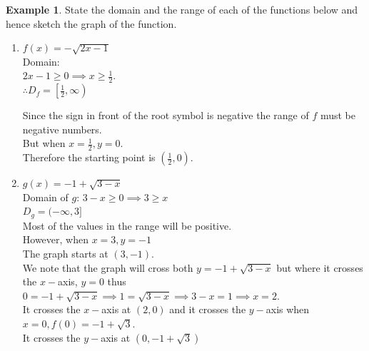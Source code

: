 \documentclass[11pt,a4paper]{article}
\theoremstyle{definition}
\newtheorem{example}[thm]{Example}
\begin{document}
\begin{example}

State the domain and the range of each of the functions below and hence sketch the graph of the function.

\begin{enumerate}
\item $f(x)=-\sqrt{2x-1}$\\

Domain:\\
$2x-1\geq 0\implies x\geq \frac{1}{2}$.\\

$\therefore D_f=\left[\frac{1}{2},\infty\right)$

Since the sign in front of the root symbol is negative the range of $f$ must be negative numbers.\\
But when $x=\frac{1}{2}, y=0$.\\
Therefore the starting point is $\left(\frac{1}{2},0\right).$




\begin{figure}[H]
\centering
{}
\end{figure}


\item $g(x)=-1+\sqrt{3-x}$\\

Domain of $g$: $3-x\geq 0\implies 3\geq x$\\

$D_g=(-\infty,3]$\\

Most of the values in the range will be positive.\\
However, when $x=3, y=-1$\\
The graph starts at $(3,-1)$.\\
We note that the graph will cross both $y=-1+\sqrt{3-x}$ but where it crosses the $x-$axis, $y=0$ thus $0=-1+\sqrt{3-x}\implies 1=\sqrt{3-x}\implies 3-x=1\implies x=2$.\\

It crosses the $x-$axis at $(2,0)$ and it crosses the $y-$axis when $x=0, f(0)=-1+\sqrt{3}$.\\
It crosses the $y-$axis at $(0,-1+\sqrt{3})$



\end{enumerate}
\end{example}
\end{document}
